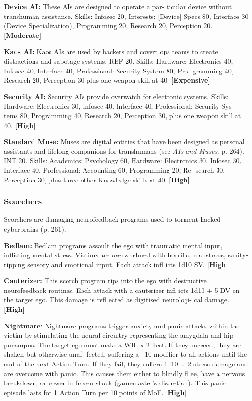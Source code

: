 \textbf{Device AI:} These AIs are designed to operate a par-
ticular device without transhuman assistance. Skills: 
Infosec 20, Interests: [Device] Specs 80, Interface 30 
(Device Specialization), Programming 20, Research 20, 
Perception 20. \textbf{[Moderate]}

\textbf{Kaos AI:} Kaos AIs are used by hackers and covert 
ops teams to create distractions and sabotage systems. 
REF 20. Skills: Hardware: Electronics 40, Infosec 40, 
Interface 40, Professional: Security System 80, Pro-
gramming 40, Research 20, Perception 30 plus one 
weapon skill at 40. \textbf{[Expensive]}

\textbf{Security AI:} Security AIs provide overwatch for 
electronic systems. Skills: Hardware: Electronics 30, 
Infosec 40, Interface 40, Professional: Security Sys-
tems 80, Programming 40, Research 20, Perception 
30, plus one weapon skill at 40. \textbf{[High]}

\textbf{Standard Muse:} Muses are digital entities that have 
been designed as personal assistants and lifelong 
companions for transhumans (see \textit{AIs and Muses,}
p. 264). INT 20. Skills: Academics: Psychology 60, 
Hardware: Electronics 30, Infosec 30, Interface 40, 
Professional: Accounting 60, Programming 20, Re-
search 30, Perception 30, plus three other Knowledge 
skills at 40. \textbf{[High]}

\subsubsection{Scorchers}

Scorchers are damaging neurofeedback programs used 
to torment hacked cyberbrains (p. 261).

\textbf{Bedlam:} Bedlam programs assault the ego with 
traumatic mental input, inflicting mental stress. 
Victims are overwhelmed with horrific,  monstrous, 
sanity-ripping sensory and emotional input. Each 
attack infl icts 1d10 SV. \textbf{[High]}

\textbf{Cauterizer:} This scorch program rips into the ego 
with destructive neurofeedback routines. Each attack 
with a cauterizer infl icts 1d10 + 5 DV on the target 
ego. This damage is refl ected as digitized neurologi-
cal damage. \textbf{[High]}

\textbf{Nightmare:} Nightmare programs trigger anxiety 
and panic attacks within the victim by stimulating the 
neural circuitry representing the amygdala and hip-
pocampus. The target ego must make a WIL x 2 Test. 
If they succeed, they are shaken but otherwise unaf-
fected, suffering a –10 modifier to all actions until the 
end of the next Action Turn. If they fail, they suffers 
1d10 ÷ 2 stress damage and are overcome with panic. 
This causes them either to blindly fl ee, have a nervous 
breakdown, or cower in frozen shock (gamemaster's 
discretion). This panic episode lasts for 1 Action Turn 
per 10 points of MoF. \textbf{[High]}

